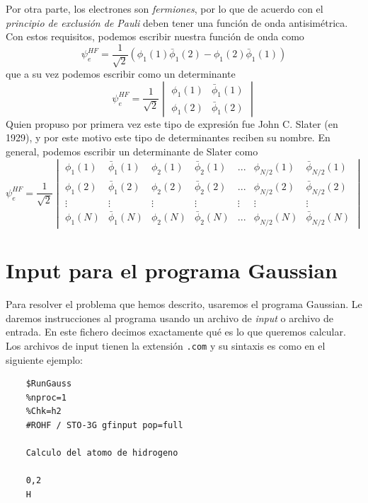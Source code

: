 \documentclass{tufte-book}
\begin{document}
Por otra parte, los electrones son \textit{fermiones}, por
lo que de acuerdo con el \textit{principio de exclusión de Pauli}
deben tener una función de onda antisimétrica. Con estos 
requisitos, podemos escribir nuestra función de onda como
\begin{equation}
    \psi_e^{HF}=\frac{1}{\sqrt{2}}(\phi_1(1)\bar{\phi}_1(2)-\phi_1(2)\bar{\phi}_1(1))
\end{equation}
que a su vez podemos escribir como un determinante
\begin{equation}
    \psi_e^{HF}=\frac{1}{\sqrt{2}} 
    \begin{vmatrix}
    \phi_1(1) & \bar{\phi}_1(1)\\ 
    \phi_1(2) & \bar{\phi}_1(2)
    \end{vmatrix}
\end{equation}
Quien propuso por primera vez este tipo de expresión fue
John C. Slater (en 1929), y por este motivo este tipo
de determinantes reciben su nombre. En general, podemos
escribir un determinante de Slater como
\begin{equation}
    \psi_e^{HF}=\frac{1}{\sqrt{2}} 
    \begin{vmatrix}
    \phi_1(1) & \bar{\phi}_1(1) & \phi_2(1) & \bar{\phi}_2(1)& ...& \phi_{N/2}(1) & \bar{\phi}_{N/2}(1)\\ 
    \phi_1(2) & \bar{\phi}_1(2) & \phi_2(2) & \bar{\phi}_2(2)& ...& \phi_{N/2}(2) & \bar{\phi}_{N/2}(2) \\
    \vdots & \vdots &\vdots &\vdots &\vdots &\vdots &\vdots \\
    \phi_1(N) & \bar{\phi}_1(N) & \phi_2(N) & \bar{\phi}_2(N)& ...& \phi_{N/2}(N) & \bar{\phi}_{N/2}(N)
    \end{vmatrix}
\end{equation}

\section{Input para el programa Gaussian}
Para resolver el problema que hemos descrito, usaremos
el programa Gaussian. Le daremos instrucciones al programa
usando un archivo de \textit{input} o archivo de entrada.
En este fichero decimos exactamente qué es lo que queremos
calcular. Los archivos de input tienen la extensión 
\texttt{.com} y su sintaxis es como en el siguiente ejemplo:
\begin{verbatim}
    $RunGauss
    %nproc=1
    %Chk=h2
    #ROHF / STO-3G gfinput pop=full

    Calculo del atomo de hidrogeno 
 
    0,2
    H
\end{verbatim}
\end{document}
